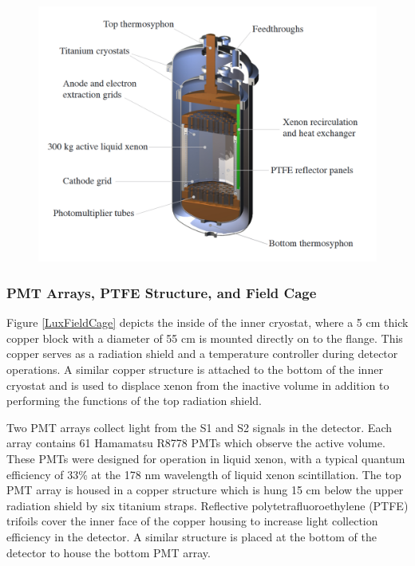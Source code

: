  \begin{figure} 
\includegraphics[scale=.45]{LuxCryostat.png} 
\label{LuxCross}
\end{figure}

	
\subsubsection{PMT Arrays, PTFE Structure, and Field Cage}
Figure \ref{LuxFieldCage} depicts the inside of the inner cryostat, where a 5 cm thick copper block with a diameter of 55 cm is mounted directly on to the flange.  This copper serves as a radiation shield and a temperature controller during detector operations. A similar copper structure is attached to the bottom of the inner cryostat and is used to displace xenon from the inactive volume in addition to performing the functions of the top radiation shield.  

Two PMT arrays collect light from the S1 and S2 signals in the detector.  Each array contains 61 Hamamatsu R8778 PMTs which observe the active volume.  These PMTs were designed for operation in liquid xenon, with a typical quantum efficiency of 33\% at the 178 nm wavelength of liquid xenon scintillation.  The top PMT array is housed in a copper structure which is hung 15 cm below the upper radiation shield by six titanium straps.  Reflective polytetrafluoroethylene (PTFE)   trifoils cover the inner face of the copper housing to increase light collection efficiency in the detector.  A similar structure is placed at the bottom of the detector to house the bottom PMT array. 

